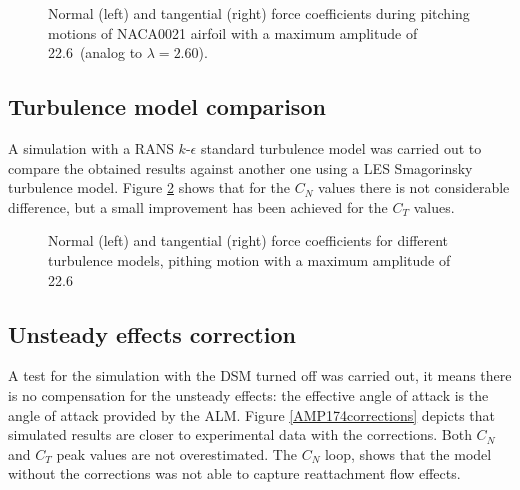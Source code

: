 \documentclass[a4paper]{jpconf}
\begin{document}
\begin{figure}[h]
\begin{minipage}{18pc}
\resizebox{\columnwidth}{!}{}
\end{minipage}\hspace{2pc}%
\begin{minipage}{18pc}
\resizebox{\columnwidth}{!}{}
\end{minipage}
\caption{\label{fig226}Normal (left) and tangential (right) force coefficients during pitching motions of NACA0021 airfoil with a maximum amplitude of 22.6\degree\ (analog to $\lambda = 2.60$).}
\end{figure}

\subsection{Turbulence model comparison}
A simulation with a RANS $k$-$\epsilon$ standard turbulence model was carried out to compare the obtained results against another one using a LES Smagorinsky turbulence model. Figure \ref{RANSLES} shows that for the $C_N$ values there is not considerable difference, but a small improvement has been achieved for the $C_T$ values.

\begin{figure}[h]
\begin{minipage}{18pc}
\resizebox{\columnwidth}{!}{}
\end{minipage}\hspace{2pc}%
\begin{minipage}{18pc}
\resizebox{\columnwidth}{!}{}
\end{minipage}
\caption{\label{RANSLES}Normal (left) and tangential (right) force coefficients for different turbulence models, pithing motion with a maximum amplitude of 22.6\degree\ }
\end{figure}

\subsection{Unsteady effects correction}
A test for the simulation with the DSM turned off was carried out, it means there is no compensation for the unsteady effects: the effective angle of attack is the angle of attack provided by the ALM. Figure \ref{AMP174corrections} depicts that simulated results are closer to experimental data with the corrections. Both $C_N$ and $C_T$ peak values are not overestimated. The $C_N$ loop, shows that the model without the corrections was not able to capture reattachment flow effects.
\end{document}
